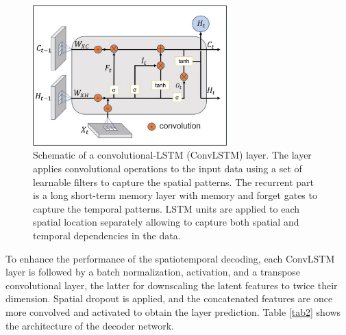 \documentclass[10pt, twoside]{article}
\begin{document}
\begin{figure}[h]
    \centering
    \includegraphics[width=7.5cm]{figures/convlstm.jpg}
    \caption{Schematic of a convolutional-LSTM (ConvLSTM) layer. The layer applies convolutional operations to the input data using a set of learnable filters to capture the spatial patterns. The recurrent part is a long short-term memory layer with memory and forget gates to capture the temporal patterns. LSTM units are applied to each spatial location separately allowing to capture both spatial and temporal dependencies in the data. }
    \label{convlstm}
\end{figure}

To enhance the performance of the spatiotemporal decoding, each ConvLSTM layer is followed by a batch normalization, activation, and a transpose convolutional layer, the latter for downscaling the latent features to twice their dimension. Spatial dropout is applied, and the concatenated features are once more convolved and activated to obtain the layer prediction. Table \ref{tab2} shows the architecture of the decoder network.
\end{document}
